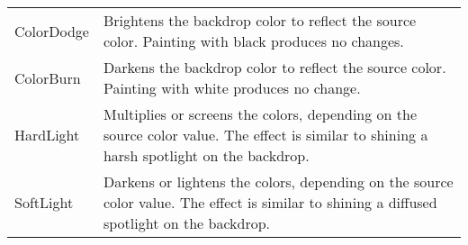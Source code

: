 \documentclass{article}
\begin{document}
\begin{longtable}{>{\ttfamily}lp{3.5in}}
ColorDodge &Brightens the backdrop color to reflect the source
            color. Painting with black produces no changes.
\\[3pt]

ColorBurn & Darkens the backdrop color to reflect the source color.
            Painting with white produces no change.
\\[3pt]


HardLight & Multiplies or screens the colors, depending on the
            source color value. The effect is similar to shining a harsh
            spotlight on the backdrop.
\\[3pt]

SoftLight & Darkens or lightens the colors, depending on the source
            color value. The effect is similar to shining a diffused spotlight
            on the backdrop.
\\[3pt]


\end{longtable}
\end{document}
